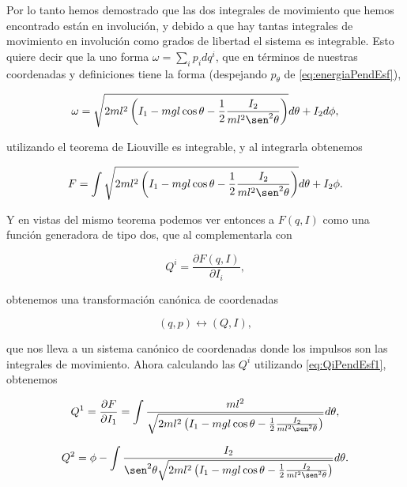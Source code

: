 \documentclass[a4paper,10pt]{article}
\numberwithin{equation}{section}
\begin{document}
Por lo tanto hemos demostrado que las dos integrales de movimiento que hemos encontrado 
están en involución, y debido a que hay tantas integrales de movimiento en involución como grados 
de libertad el sistema es integrable. Esto quiere decir que la uno forma $\omega = 
\sum_i p_idq^i$, que en términos de nuestras coordenadas y definiciones tiene la 
forma (despejando $p_\theta$ de \eqref{eq:energiaPendEsf}),

\begin{equation}
 \omega = \sqrt{2ml^2\left(I_1 - mgl\cos{\theta} - \frac{1}{2}\frac{I_2}{ml^2\sen^2{\theta}}
 \right)}d\theta + I_2d\phi,
\end{equation}

utilizando el teorema de Liouville es integrable, y al integrarla obtenemos 

\begin{equation}
 F = \int \sqrt{2ml^2\left(I_1 - mgl\cos{\theta} - \frac{1}{2}\frac{I_2}{ml^2\sen^2{\theta}}
 \right)}d\theta + I_2\phi.
\end{equation}

Y en vistas del mismo teorema podemos ver entonces a $F(q,I)$ como una función 
generadora de tipo dos, que al complementarla con 

\begin{equation}
 Q^i = \frac{\partial F(q,I)}{\partial I_i},
 \label{eq:QiPendEsf1}
\end{equation}

obtenemos una transformación canónica de coordenadas 

\begin{equation}
 (q,p) \leftrightarrow (Q,I),
\end{equation}

que nos lleva a un sistema canónico de coordenadas donde los impulsos son las 
integrales de movimiento. Ahora calculando las $Q^i$ utilizando \eqref{eq:QiPendEsf1}, 
obtenemos 

\begin{equation}
 Q^1 = \frac{\partial F}{\partial I_1} = \int \frac{ml^2}{\sqrt{2ml^2\left(I_1 -
 mgl\cos{\theta} - \frac{1}{2}\frac{I_2}{ml^2\sen^2{\theta}} \right)}}d\theta,
 \label{eq:Q1PendEsf1}
\end{equation}

\begin{equation}
 Q^2 = \phi - \int \frac{I_2}{\sen^2{\theta}\sqrt{2ml^2\left(I_1 - mgl\cos{\theta} - 
 \frac{1}{2}\frac{I_2}{ml^2\sen^2{\theta}} \right)}}d\theta.
 \label{eq:Q2PendEsf2}
\end{equation}
\end{document}
